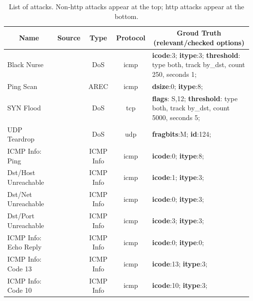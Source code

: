 \documentclass[conference]{IEEEtran}
\begin{document}
\begin{table}[t!]
  \footnotesize
  \caption{\label{table:attacks}List of attacks. Non-http attacks
    appear at the top; http attacks appear at the bottom.}
  \vspace{-2ex}
  \centering
  \setlength{\tabcolsep}{4.5pt}
  \renewcommand{\arraystretch}{0.35}
  \begin{tabular}{lcccp{10.9cm}}
    \toprule
    \multicolumn{1}{c}{Name} &
    \multicolumn{1}{c}{Source} &
    \multicolumn{1}{c}{Type} &
    \multicolumn{1}{c}{Protocol} &
    \multicolumn{1}{c}{Groud Truth (relevant/checked options)} \\
    \midrule
    Black Nurse & \cite{pcap-attacks} & DoS & icmp & \textbf{icode}:3; \textbf{itype}:3; \textbf{threshold}: type both, track by\_dst, count 250, seconds 1;\\    
    Ping Scan & \cite{netmap} & AREC & icmp & \textbf{dsize}:0; \textbf{itype}:8; \\
    SYN Flood & \cite{hping3} & DoS & tcp & \textbf{flags}: S,12;
    \textbf{threshold}: type both, track by\_dst, count 5000, seconds 5;\\
    UDP Teardrop & \cite{udp-teardrop-source} & DoS & udp & \textbf{fragbits}:M; \textbf{id}:124; \\
      ICMP Info: Ping & \cite{iscx} & ICMP Info & icmp & \textbf{icode}:0; \textbf{itype}:8; \\
      Dst/Host Unreachable & \cite{iscx} & ICMP Info & icmp & \textbf{icode}:1; \textbf{itype}:3; \\
      Dst/Net Unreachable & \cite{iscx} & ICMP Info & icmp & \textbf{icode}:0; \textbf{itype}:3; \\
      Dst/Port Unreachable & \cite{iscx} & ICMP Info & icmp & \textbf{icode}:3; \textbf{itype}:3; \\
      ICMP Info: Echo Reply & \cite{iscx} & ICMP Info & icmp & \textbf{icode}:0; \textbf{itype}:0; \\
      ICMP Info: Code 13 & \cite{iscx} & ICMP Info & icmp & \textbf{icode}:13; \textbf{itype}:3; \\
      ICMP Info: Code 10 & \cite{iscx} & ICMP Info & icmp & \textbf{icode}:10; \textbf{itype}:3; \\
    \midrule

\end{tabular}
\end{table}
\end{document}
